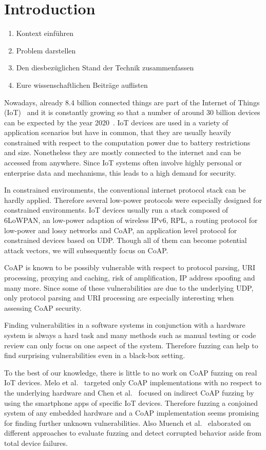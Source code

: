 \section{Introduction}

\begin{enumerate}
	\item Kontext einführen
	\item Problem darstellen
	\item Den diesbezüglichen Stand der Technik zusammenfassen
	\item Eure wissenschaftlichen Beiträge auflisten
\end{enumerate}

Nowadays, already 8.4 billion connected things are part of the Internet of Things (IoT)~\cite{IoTForecastGartner} and it is constantly growing so that a number of around 30 billion devices can be expected by the year 2020~\cite{IoTForecastNordrum}. IoT devices are used in a variety of application scenarios but have in common, that they are usually heavily constrained with respect to the computation power due to battery restrictions and size. Nonetheless they are mostly connected to the internet and can be accessed from anywhere. Since IoT systems often involve highly personal or enterprise data and mechanisms, this leads to a high demand for security. 

In constrained environments, the conventional internet protocol stack can be hardly applied. Therefore several low-power protocols were especially designed for constrained environments. IoT devices usually run a stack composed of 6LoWPAN, an low-power adaption of wireless IPv6, RPL, a routing protocol for low-power and lossy networks and CoAP, an application level protocol for constrained devices based on UDP. Though all of them can become potential attack vectors, we will subsequently focus on CoAP.

CoAP is known to be possibly vulnerable with respect to protocol parsing, URI processing, proxying and caching, risk of amplification, IP address spoofing and many more. Since some of these vulnerabilities are due to the underlying UDP, only protocol parsing and URI processing are especially interesting when assessing CoAP security.

Finding vulnerabilities in a software systems in conjunction with a hardware system is always a hard task and many methods such as manual testing or code review can only focus on one aspect of the system. Therefore fuzzing can help to find surprising vulnerabilities even in a black-box setting.


To the best of our knowledge, there is little to no work on CoAP fuzzing on real IoT devices. Melo et al.~\cite{Melo2017RobustnessTO} targeted only CoAP implementations with no respect to the underlying hardware and Chen et al.~\cite{chen2018ndss} focused on indirect CoAP fuzzing by using the smartphone apps of specific IoT devices. Therefore fuzzing a conjoined system of any embedded hardware and a CoAP implementation seems promising for finding further unknown vulnerabilities. Also Muench et al.~\cite{EURECOM+5417} elaborated on different approaches to evaluate fuzzing and detect corrupted behavior aside from total device failures.